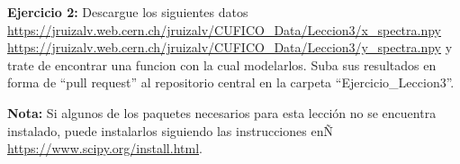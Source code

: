 \documentclass[10.5pt]{article}
\begin{document}
{\textbf{Ejercicio 2:}} Descargue los siguientes datos \url{https://jruizalv.web.cern.ch/jruizalv/CUFICO_Data/Leccion3/x_spectra.npy} \url{https://jruizalv.web.cern.ch/jruizalv/CUFICO_Data/Leccion3/y_spectra.npy} y trate de encontrar una funcion con la cual modelarlos. Suba sus resultados en forma de ``pull request'' al repositorio central en la carpeta ``Ejercicio\_Leccion3''. 

{\textbf{Nota:}} Si algunos de los paquetes necesarios para esta lección no se encuentra instalado, puede instalarlos siguiendo las instrucciones enÑ \url{https://www.scipy.org/install.html}.

%




%
\end{document}
